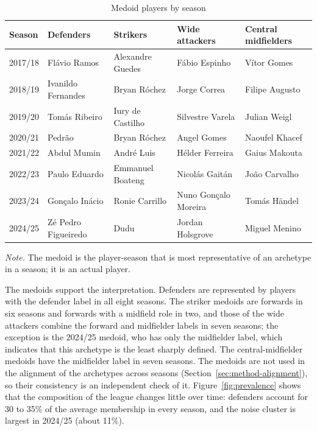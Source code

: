 \begin{table}[ht]
	\centering
	\small
	\caption{Medoid players by season}
	\label{tab:medoids}
	\begin{tabular}{lllll}
		\toprule
		Season & Defenders & Strikers & Wide attackers & Central midfielders \\
		\midrule
2017/18 & Flávio Ramos & Alexandre Guedes & Fábio Espinho & Vítor Gomes \\
2018/19 & Ivanildo Fernandes & Bryan Róchez & Jorge Correa & Filipe Augusto \\
2019/20 & Tomás Ribeiro & Iury de Castilho & Silvestre Varela & Julian Weigl \\
2020/21 & Pedrão & Bryan Róchez & Angel Gomes & Naoufel Khacef \\
2021/22 & Abdul Mumin & André Luis & Hélder Ferreira & Gaius Makouta \\
2022/23 & Paulo Eduardo & Emmanuel Boateng & Nicolás Gaitán & João Carvalho \\
2023/24 & Gonçalo Inácio & Ronie Carrillo & Nuno Gonçalo Moreira & Tomás Händel \\
2024/25 & Zé Pedro Figueiredo & Dudu & Jordan Holsgrove & Miguel Menino \\
		\bottomrule
	\end{tabular}
	\par\smallskip
	\parbox{0.95\textwidth}{\footnotesize\emph{Note.} The medoid is the player-season that is most representative of an archetype in a season; it is an actual player.}
\end{table}

The medoids support the interpretation. Defenders are represented by players with the defender label in all eight seasons. The striker medoids are forwards in six seasons and forwards with a midfield role in two, and those of the wide attackers combine the forward and midfielder labels in seven seasons; the exception is the 2024/25 medoid, who has only the midfielder label, which indicates that this archetype is the least sharply defined. The central-midfielder medoids have the midfielder label in seven seasons. The medoids are not used in the alignment of the archetypes across seasons (Section~\ref{sec:method-alignment}), so their consistency is an independent check of it. Figure~\ref{fig:prevalence} shows that the composition of the league changes little over time: defenders account for 30 to 35\% of the average membership in every season, and the noise cluster is largest in 2024/25 (about 11\%).

